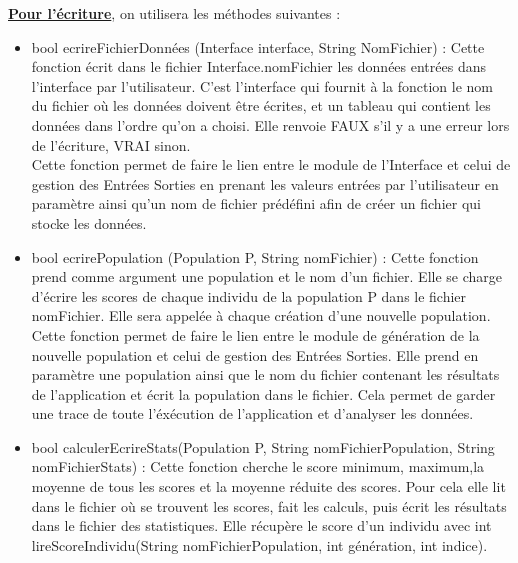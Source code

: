 \documentclass[a4paper,11pt]{article}
\begin{document}
			\underline{\bf Pour l'écriture}, on utilisera les méthodes suivantes :\\
			\begin{itemize}
				\item bool ecrireFichierDonnées (Interface interface, String NomFichier) : Cette fonction écrit dans le fichier Interface.nomFichier les données entrées dans l’interface par l’utilisateur. 
					C’est l’interface qui fournit à la fonction le nom du fichier où les données doivent être écrites, et un tableau qui contient les données dans l’ordre qu’on a choisi. 
					Elle renvoie FAUX s’il y a une erreur lors de l’écriture, VRAI sinon.\\
					Cette fonction permet de faire le lien entre le module de l’Interface et celui de gestion des Entrées Sorties en prenant les valeurs entrées par l’utilisateur en paramètre ainsi qu’un nom de fichier prédéfini afin de créer un fichier qui stocke les données.\vspace{0.2cm}
				\item bool ecrirePopulation (Population P, String nomFichier) : Cette fonction prend comme argument une population et le nom d’un fichier. 
					Elle se charge d’écrire les scores de chaque individu de la population P dans le fichier nomFichier. 
					Elle sera appelée à chaque création d’une nouvelle population. %
					Cette fonction permet de faire le lien entre le module de génération de la nouvelle population et celui de gestion des Entrées Sorties. 
					Elle prend en paramètre une population ainsi que le nom du fichier contenant les résultats de l’application et écrit la population dans le fichier. 
					Cela permet de garder une trace de toute l’éxécution de l’application et d’analyser les données.\vspace{0.2cm}
				\item bool calculerEcrireStats(Population P, String nomFichierPopulation, String nomFichierStats) : Cette fonction cherche le score minimum, maximum,la moyenne de tous les scores et la moyenne réduite des scores. 
					Pour cela elle lit dans le fichier où se trouvent les scores, fait les calculs, puis écrit les résultats dans le fichier des statistiques. 
					Elle récupère le score d’un individu avec int lireScoreIndividu(String nomFichierPopulation, int génération, int indice). %

\end{itemize}
\end{document}
